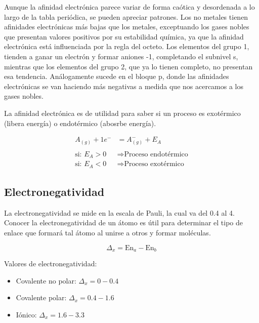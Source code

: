 
Aunque la afinidad electrónica parece variar de forma caótica y desordenada a lo largo de la tabla periódica, se pueden apreciar patrones. Los no metales tienen afinidades electrónicas más bajas que los metales, exceptuando los gases nobles que presentan valores positivos por su estabilidad química, ya que la afinidad electrónica está influenciada por la regla del octeto.
Los elementos del grupo 1, tienden a ganar un electrón y formar aniones -1, completando el subnivel s, mientras que los elementos del grupo 2, que ya lo tienen completo, no presentan esa tendencia. Análogamente sucede en el bloque p, donde las afinidades electrónicas se van haciendo más negativas a medida que nos acercamos a los gases nobles.

La afinidad electrónica es de utilidad para saber si un proceso es exotérmico (libera energía) o endotérmico (abosrbe energía).

\begin{align*}
    A_{(g)} + 1e^{-} &= A_{(g)}^{-} + E_{A}
    \\
    \\
    \text{si: } E_{A} > 0 &\Longrightarrow \text{Proceso endotérmico}
    \\
    \text{si: } E_{A} < 0 &\Longrightarrow \text{Proceso exotérmico}
\end{align*}

\subsection{Electronegatividad}


La electronegatividad se mide en la escala de Pauli, la cual va del 0.4 al 4. Conocer la electronegatividad de un átomo es útil para determinar el tipo de enlace que formará tal átomo al unirse a otros y formar moléculas.

\begin{equation*}
    \Delta_{x} = \text{En}_{a} - \text{En}_{b}
\end{equation*}

Valores de electronegatividad:

\begin{itemize}
  \item Covalente no polar:  $\Delta_{x} = 0-0.4$
  \item Covalente polar: $\Delta_{x} = 0.4-1.6$
  \item Iónico: $\Delta_{x} = 1.6-3.3$
\end{itemize}


